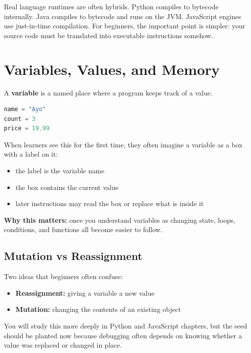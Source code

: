 \documentclass[12pt, a4paper, oneside]{book}
\begin{document}
\begin{notebox}
Real language runtimes are often hybrids. Python compiles to bytecode internally. Java compiles to bytecode and runs on the JVM. JavaScript engines use just-in-time compilation. For beginners, the important point is simpler: your source code must be translated into executable instructions somehow.
\end{notebox}

\section{Variables, Values, and Memory}

A \textbf{variable} is a named place where a program keeps track of a value.

\begin{lstlisting}[language=Python, caption={Variables hold state}]
name = "Ayo"
count = 3
price = 19.99
\end{lstlisting}

When learners see this for the first time, they often imagine a variable as a box with a label on it:
\begin{itemize}[leftmargin=2em]
    \item the label is the variable name
    \item the box contains the current value
    \item later instructions may read the box or replace what is inside it
\end{itemize}

\textbf{Why this matters:} once you understand variables as changing state, loops, conditions, and functions all become easier to follow.

\subsection{Mutation vs Reassignment}
Two ideas that beginners often confuse:
\begin{itemize}[leftmargin=2em]
    \item \textbf{Reassignment:} giving a variable a new value
    \item \textbf{Mutation:} changing the contents of an existing object
\end{itemize}

You will study this more deeply in Python and JavaScript chapters, but the seed should be planted now because debugging often depends on knowing whether a value was replaced or changed in place.
\end{document}
